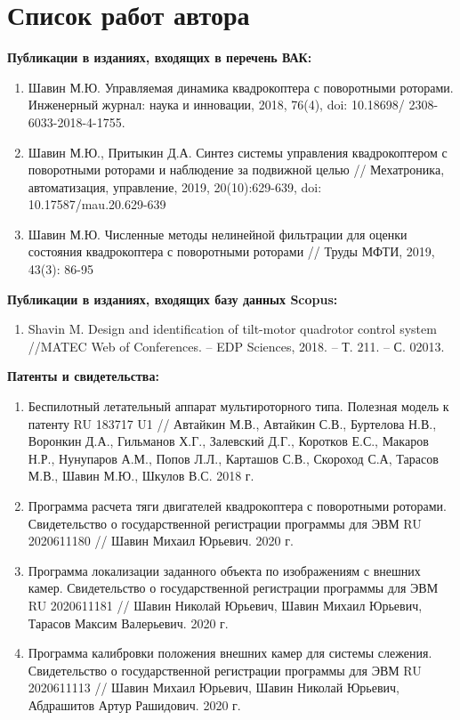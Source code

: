 \chapter*{Список работ автора}
\label{list_chapter}

\textbf{Публикации в изданиях, входящих в перечень ВАК:}
\begin{enumerate}
	
	\item Шавин М.Ю. Управляемая динамика квадрокоптера с поворотными роторами. Инженерный журнал: наука и инновации, 2018, 76(4), doi: 10.18698/ 2308-6033-2018-4-1755.
	
	\item  Шавин М.Ю., Притыкин Д.А. Синтез системы управления квадрокоптером с поворотными роторами и наблюдение за подвижной целью // Мехатроника, автоматизация, управление, 2019, 20(10):629-639, doi:\\ 10.17587/mau.20.629-639
	
	\item  Шавин М.Ю. Численные методы нелинейной фильтрации для оценки состояния квадрокоптера с   поворотными роторами // Труды МФТИ, 2019, 43(3): 86-95
\end{enumerate}

\textbf{Публикации в изданиях, входящих базу данных Scopus:}
\begin{enumerate}
	\item Shavin M. Design and identification of tilt-motor quadrotor control system //MATEC Web of Conferences. – EDP Sciences, 2018. – Т. 211. – С. 02013.
\end{enumerate}

\textbf{Патенты и свидетельства:}
\begin{enumerate}
	\item Беспилотный летательный аппарат мультироторного типа. Полезная модель к патенту RU 183717 U1 //
	Автайкин М.В., Автайкин С.В., Буртелова Н.В.,
	Воронкин Д.А., Гильманов Х.Г., Залевский Д.Г.,
	Коротков Е.С., Макаров Н.Р., Нунупаров А.М.,
	Попов Л.Л., Карташов С.В., Скороход С.А,
	Тарасов М.В., Шавин М.Ю., Шкулов В.С. 2018 г.
	
	\item Программа расчета тяги двигателей квадрокоптера с поворотными роторами. Свидетельство о государственной регистрации программы для ЭВМ RU 2020611180 // Шавин Михаил Юрьевич. 2020 г.
	
	\item Программа локализации заданного объекта по изображениям с внешних камер. Свидетельство о государственной регистрации программы для ЭВМ RU 2020611181 // Шавин Николай Юрьевич, Шавин Михаил Юрьевич, Тарасов Максим Валерьевич. 2020 г.
	
	\item Программа калибровки положения внешних камер для системы слежения. Свидетельство о государственной регистрации программы для ЭВМ  RU 2020611113 // Шавин Михаил Юрьевич, Шавин Николай Юрьевич, Абдрашитов Артур Рашидович. 2020 г.
\end{enumerate}

